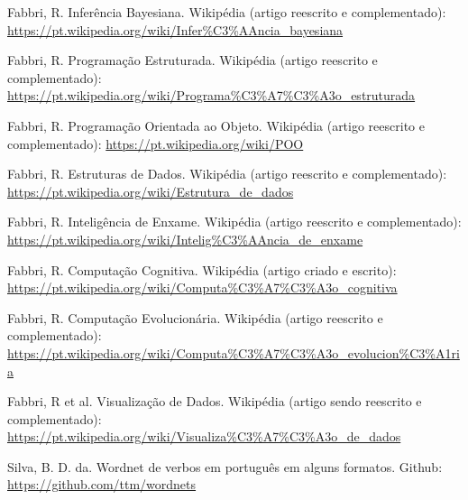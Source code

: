 \documentclass[a4paper, 11pt]{article}
\begin{document}
\begin{thebibliography}{99}
  Fabbri, R. Inferência Bayesiana. Wikipédia (artigo reescrito e complementado): \url{https://pt.wikipedia.org/wiki/Infer%C3%AAncia_bayesiana}

  Fabbri, R. Programação Estruturada. Wikipédia (artigo reescrito e complementado): \url{https://pt.wikipedia.org/wiki/Programa%C3%A7%C3%A3o_estruturada}

  Fabbri, R. Programação Orientada ao Objeto. Wikipédia (artigo reescrito e complementado): \url{https://pt.wikipedia.org/wiki/POO}

  Fabbri, R. Estruturas de Dados. Wikipédia (artigo reescrito e complementado): \url{https://pt.wikipedia.org/wiki/Estrutura_de_dados}

  Fabbri, R. Inteligência de Enxame. Wikipédia (artigo reescrito e complementado): \url{https://pt.wikipedia.org/wiki/Intelig%C3%AAncia_de_enxame}

  Fabbri, R. Computação Cognitiva. Wikipédia (artigo criado e escrito): \url{https://pt.wikipedia.org/wiki/Computa%C3%A7%C3%A3o_cognitiva}

  Fabbri, R. Computação Evolucionária. Wikipédia (artigo reescrito e complementado): \url{https://pt.wikipedia.org/wiki/Computa%C3%A7%C3%A3o_evolucion%C3%A1ria}

  Fabbri, R et al. Visualização de Dados. Wikipédia (artigo sendo reescrito e complementado): \url{https://pt.wikipedia.org/wiki/Visualiza%C3%A7%C3%A3o_de_dados}

  Silva, B. D. da. Wordnet de verbos em português em alguns formatos. Github: \url{https://github.com/ttm/wordnets}

\end{thebibliography}
\end{document}
